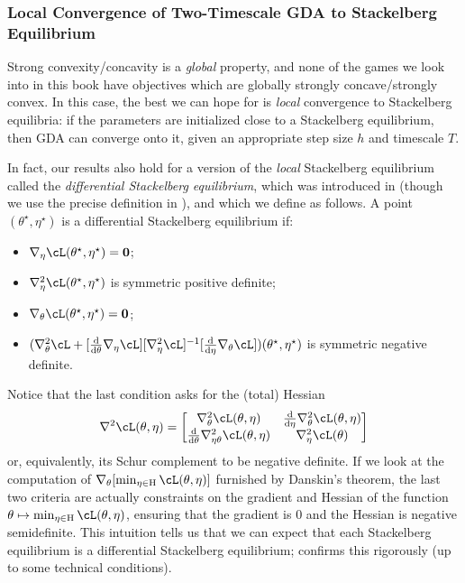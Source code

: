 \documentclass[../../book-main.tex]{subfiles}
\begin{document}
\subsubsection{Local Convergence of Two-Timescale GDA to Stackelberg Equilibrium}

Strong convexity/concavity is a \textit{global} property, and none of the games we look into in this book have objectives which are globally strongly concave/strongly convex. In this case, the best we can hope for is \textit{local} convergence to Stackelberg equilibria: if the parameters are initialized close to a Stackelberg equilibrium, then GDA can converge onto it, given an appropriate step size \(h\) and timescale \(T\). 

In fact, our results also hold for a version of the \textit{local} Stackelberg equilibrium called the \textit{differential Stackelberg equilibrium}, which was introduced in \cite{fiez2019convergence} (though we use the precise definition in \cite{li2022convergence}), and which we define as follows. A point \((\theta^{\star}, \eta^{\star})\) is a differential Stackelberg equilibrium if:
\begin{itemize}
    \item \(\nabla_{\eta}\cL(\theta^{\star}, \eta^{\star}) = \vzero\);
    \item \(\nabla_{\eta}^{2}\cL(\theta^{\star}, \eta^{\star})\) is symmetric positive definite;
    \item \(\nabla_{\theta}\cL(\theta^{\star}, \eta^{\star}) = \vzero\);
    \item \((\nabla_{\theta}^{2}\cL + [\odv*{\nabla_{\eta}\cL}{\theta}][\nabla_{\eta}^{2}\cL]^{-1}[\odv*{\nabla_{\theta}\cL}{\eta}])(\theta^{\star}, \eta^{\star})\) is symmetric negative definite.
\end{itemize}
Notice that the last condition asks for the (total) Hessian
\begin{equation}
    \nabla^{2} \cL(\theta, \eta) = \mat{\nabla_{\theta}^{2}\cL(\theta, \eta) & \odv*{\nabla_{\theta}^{2}\cL(\theta, \eta)}{\eta} \\ \odv*{\nabla_{\eta\theta}^{2}\cL(\theta, \eta)}{\theta} & \nabla_{\eta}^{2}\cL(\theta)}
\end{equation}
or, equivalently, its Schur complement to be negative definite. If we look at the computation of \(\nabla_{\theta}[\min_{\eta \in \Eta}\cL(\theta, \eta)]\) furnished by Danskin's theorem, the last two criteria are actually constraints on the gradient and Hessian of the function \(\theta \mapsto \min_{\eta \in \Eta}\cL(\theta, \eta)\), ensuring that the gradient is \(0\) and the Hessian is negative semidefinite. This intuition tells us that we can expect that each Stackelberg equilibrium is a differential Stackelberg equilibrium; \cite{fiez2020implicit} confirms this rigorously (up to some technical conditions).
\end{document}
